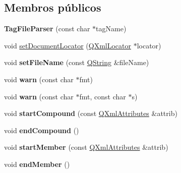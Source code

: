 \subsection*{Membros públicos}
\begin{DoxyCompactItemize}
\item 
\hypertarget{class_tag_file_parser_a602eb05fd41b7076f6d6687de4818bc3}{{\bfseries Tag\-File\-Parser} (const char $\ast$tag\-Name)}\label{class_tag_file_parser_a602eb05fd41b7076f6d6687de4818bc3}

\item 
void \hyperlink{class_tag_file_parser_a6ea335308d212e2244af77edaff21d6a}{set\-Document\-Locator} (\hyperlink{class_q_xml_locator}{Q\-Xml\-Locator} $\ast$locator)
\item 
\hypertarget{class_tag_file_parser_a5128e51d0c0a347b1b1dc376a45f3f07}{void {\bfseries set\-File\-Name} (const \hyperlink{class_q_string}{Q\-String} \&file\-Name)}\label{class_tag_file_parser_a5128e51d0c0a347b1b1dc376a45f3f07}

\item 
\hypertarget{class_tag_file_parser_a23cecfdaab1999b902fe0dcc2ca53b46}{void {\bfseries warn} (const char $\ast$fmt)}\label{class_tag_file_parser_a23cecfdaab1999b902fe0dcc2ca53b46}

\item 
\hypertarget{class_tag_file_parser_ae6bffb7d4f00a4fc9ef14bf8fcd465bf}{void {\bfseries warn} (const char $\ast$fmt, const char $\ast$s)}\label{class_tag_file_parser_ae6bffb7d4f00a4fc9ef14bf8fcd465bf}

\item 
\hypertarget{class_tag_file_parser_acf79d78c3e6bdc9e5eaa8d28eb075633}{void {\bfseries start\-Compound} (const \hyperlink{class_q_xml_attributes}{Q\-Xml\-Attributes} \&attrib)}\label{class_tag_file_parser_acf79d78c3e6bdc9e5eaa8d28eb075633}

\item 
\hypertarget{class_tag_file_parser_a328b7b29416df23c615505ec47b9d299}{void {\bfseries end\-Compound} ()}\label{class_tag_file_parser_a328b7b29416df23c615505ec47b9d299}

\item 
\hypertarget{class_tag_file_parser_a01468590a99c462fcde01bef28afdadf}{void {\bfseries start\-Member} (const \hyperlink{class_q_xml_attributes}{Q\-Xml\-Attributes} \&attrib)}\label{class_tag_file_parser_a01468590a99c462fcde01bef28afdadf}

\item 
\hypertarget{class_tag_file_parser_aad5c72a5dfbeff28021ccce9a5c307cd}{void {\bfseries end\-Member} ()}\label{class_tag_file_parser_aad5c72a5dfbeff28021ccce9a5c307cd}


\end{DoxyCompactItemize}
